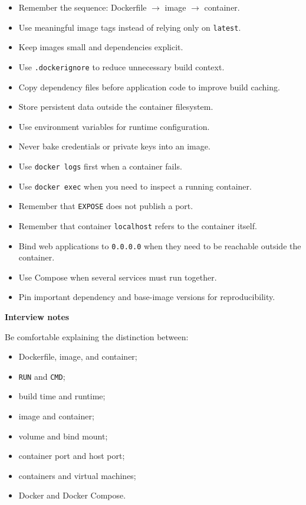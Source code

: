 \documentclass[11pt,letterpaper]{article}
\begin{document}
\begin{itemize}[leftmargin=*]
    \item Remember the sequence: Dockerfile $\rightarrow$ image $\rightarrow$
    container.
    \item Use meaningful image tags instead of relying only on
    \texttt{latest}.
    \item Keep images small and dependencies explicit.
    \item Use \texttt{.dockerignore} to reduce unnecessary build context.
    \item Copy dependency files before application code to improve build caching.
    \item Store persistent data outside the container filesystem.
    \item Use environment variables for runtime configuration.
    \item Never bake credentials or private keys into an image.
    \item Use \texttt{docker logs} first when a container fails.
    \item Use \texttt{docker exec} when you need to inspect a running container.
    \item Remember that \texttt{EXPOSE} does not publish a port.
    \item Remember that container \texttt{localhost} refers to the container itself.
    \item Bind web applications to \texttt{0.0.0.0} when they need to be reachable
    outside the container.
    \item Use Compose when several services must run together.
    \item Pin important dependency and base-image versions for reproducibility.
\end{itemize}



\textbf{Interview notes}

Be comfortable explaining the distinction between:

\begin{itemize}[leftmargin=*]
    \item Dockerfile, image, and container;
    \item \texttt{RUN} and \texttt{CMD};
    \item build time and runtime;
    \item image and container;
    \item volume and bind mount;
    \item container port and host port;
    \item containers and virtual machines;
    \item Docker and Docker Compose.
\end{itemize}
\end{document}
